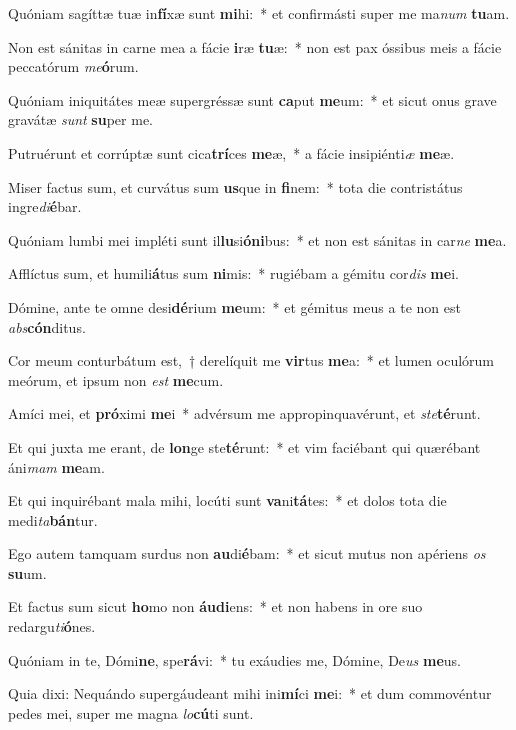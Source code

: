 \item Quóniam sagíttæ tuæ in\textbf{fí}xæ sunt \textbf{mi}hi:~* et confirmásti super me ma\textit{num} \textbf{tu}am.
\item Non est sánitas in carne mea a fácie \textbf{i}ræ \textbf{tu}æ:~* non est pax óssibus meis a fácie peccatórum \textit{me}\textbf{ó}rum.
\item Quóniam iniquitátes meæ supergréssæ sunt \textbf{ca}put \textbf{me}um:~* et sicut onus grave gravátæ \textit{sunt} \textbf{su}per me.
\item Putruérunt et corrúptæ sunt cica\textbf{trí}ces \textbf{me}æ,~* a fácie insipiénti\textit{æ} \textbf{me}æ.
\item Miser factus sum, et curvátus sum \textbf{us}que in \textbf{fi}nem:~* tota die contristátus ingre\textit{di}\textbf{é}bar.
\item Quóniam lumbi mei impléti sunt il\textbf{lu}si\textbf{ó}\textbf{ni}bus:~* et non est sánitas in car\textit{ne} \textbf{me}a.
\item Afflíctus sum, et humili\textbf{á}tus sum \textbf{ni}mis:~* rugiébam a gémitu cor\textit{dis} \textbf{me}i.
\item Dómine, ante te omne desi\textbf{dé}rium \textbf{me}um:~* et gémitus meus a te non est \textit{abs}\textbf{cón}ditus.
\item Cor meum conturbátum est,~† derelíquit me \textbf{vir}tus \textbf{me}a:~* et lumen oculórum meórum, et ipsum non \textit{est} \textbf{me}cum.
\item Amíci mei, et \textbf{pró}ximi \textbf{me}i~* advérsum me appropinquavérunt, et \textit{ste}\textbf{té}runt.
\item Et qui juxta me erant, de \textbf{lon}ge ste\textbf{té}runt:~* et vim faciébant qui quærébant áni\textit{mam} \textbf{me}am.
\item Et qui inquirébant mala mihi, locúti sunt \textbf{va}ni\textbf{tá}tes:~* et dolos tota die medi\textit{ta}\textbf{bán}tur.
\item Ego autem tamquam surdus non \textbf{au}di\textbf{é}bam:~* et sicut mutus non apériens \textit{os} \textbf{su}um.
\item Et factus sum sicut \textbf{ho}mo non \textbf{áu}\textbf{di}ens:~* et non habens in ore suo redargu\textit{ti}\textbf{ó}nes.
\item Quóniam in te, Dómi\textbf{ne}, spe\textbf{rá}vi:~* tu exáudies me, Dómine, De\textit{us} \textbf{me}us.
\item Quia dixi: Nequándo supergáudeant mihi ini\textbf{mí}ci \textbf{me}i:~* et dum commovéntur pedes mei, super me magna \textit{lo}\textbf{cú}ti sunt.
